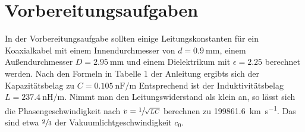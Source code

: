 \section{Vorbereitungsaufgaben}
In der Vorbereitungsaufgabe sollten einige Leitungskonstanten für ein Koaxialkabel mit einem Innendurchmesser von $d = \SI{0.9}{\mm}$,
einem Außendurchmesser $D = \SI{2.95}{\mm}$  und einem Dielektrikum mit $\epsilon = 2.25$ berechnet werden.
Nach den Formeln in Tabelle 1 der Anleitung\cite{v52} ergibts sich der Kapazitätsbelag zu $C = \SI{0.105}{\nano\farad \per \meter}$
Entsprechend ist der Induktivitätsbelag $ L = \SI{237.4}{\nano \henry \per \meter}$.
Nimmt man den Leitungswiderstand als klein an, so lässt sich die Phasengeschwindigkeit nach $v = \sfrac{1}{\sqrt{L C}}$ berechnen zu
\SI{199861.6}{\kilo\meter\per\second}. Das sind etwa $\sfrac{2}{3}$ der Vakuumlichtgeschwindigkeit $c_0$.
